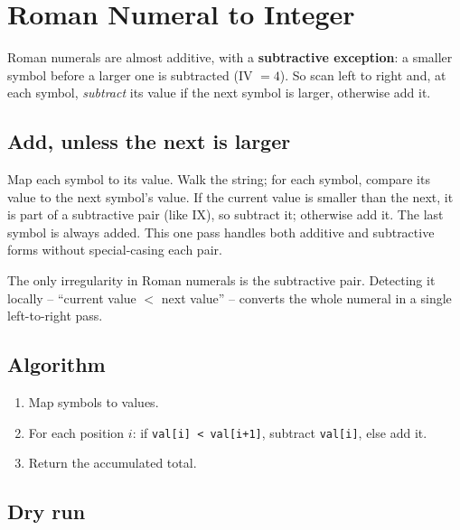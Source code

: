 \section{Roman Numeral to Integer}
\label{sec:str-roman-to-integer}


\begin{patternbox}
Roman numerals are almost additive, with a \textbf{subtractive exception}:
a smaller symbol before a larger one is subtracted (IV $=4$). So scan
left to right and, at each symbol, \emph{subtract} its value if the next
symbol is larger, otherwise add it.
\end{patternbox}

\subsection*{Add, unless the next is larger}

Map each symbol to its value. Walk the string; for each symbol, compare its
value to the next symbol's value. If the current value is smaller than the
next, it is part of a subtractive pair (like IX), so subtract it; otherwise
add it. The last symbol is always added. This one pass handles both additive
and subtractive forms without special-casing each pair.

\begin{ideabox}
The only irregularity in Roman numerals is the subtractive pair. Detecting
it locally -- ``current value $<$ next value'' -- converts the whole numeral
in a single left-to-right pass.
\end{ideabox}

\subsection*{Algorithm}

\begin{enumerate}
  \item Map symbols to values.
  \item For each position $i$: if \texttt{val[i] < val[i+1]}, subtract
        \texttt{val[i]}, else add it.
  \item Return the accumulated total.
\end{enumerate}

\subsection*{Dry run}

